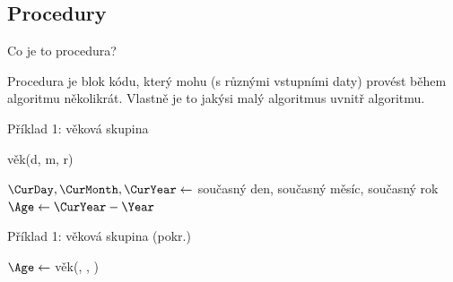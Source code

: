 \documentclass[aspectratio=169,11pt,handout]{beamer}
\let\oldnl\nl
\newcommand{\nonl}{\renewcommand{\nl}{\let\nl\oldnl}}
\begin{document}
\subsection[Procedury]{Procedury}

\begin{frame}{Co je to procedura?}
 \begin{tcolorbox}[title=Procedura,center,width=.9\textwidth]
  Procedura je \alert{blok kódu}, který mohu (s různými vstupními daty) provést
  během algoritmu několikrát. Vlastně je to jakýsi malý algoritmus uvnitř
  algoritmu.
 \end{tcolorbox}
\end{frame}

\begin{frame}{Příklad 1: věková skupina}
 \centering
 \begin{minipage}{.8\textwidth}
  \begin{procedure}[H]
  \DontPrintSemicolon

   \nonl\KwProc věk(d, m, r)\;
   \BlankLine

   \BlankLine

   $\CurDay, \CurMonth, \CurYear \leftarrow$ současný den, současný měsíc,
   současný rok\;
   $\Age \leftarrow \CurYear - \Year$\;

   \pause

   \KwReturn \Age
  \end{procedure}
 \end{minipage}
\end{frame}

\begin{frame}{Příklad 1: věková skupina (pokr.)}
 \centering
 \begin{minipage}{.8\textwidth}
  \begin{algorithm}[H]
   \DontPrintSemicolon
   \BlankLine

   $\Age \leftarrow $ věk(\Day, \Month, \Year)\;
   \pause
   \pause
   \pause
  \end{algorithm}
 \end{minipage}
\end{frame}
\end{document}
